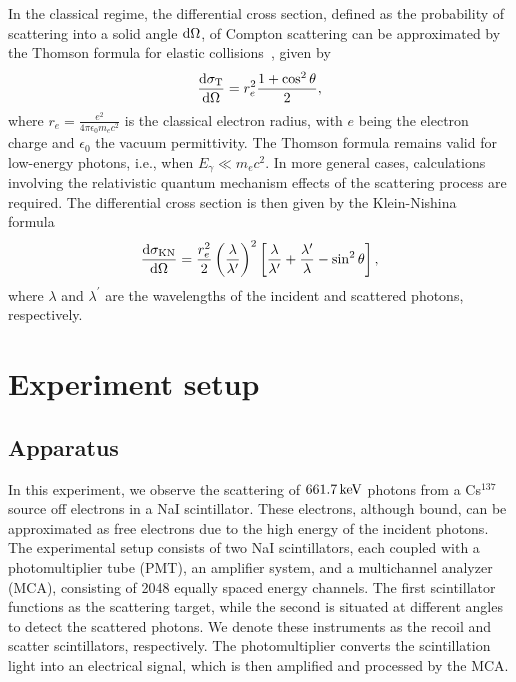\documentclass[aps,twocolumn,secnumarabic,balancelastpage,amsmath,amssymb,nofootinbib,floatfix]{revtex4-1}
\newcommand{\keV}{\,{\rm keV}}
\begin{document}
In the classical regime, the differential cross section, defined as the probability of scattering into a solid angle ${\rm{d}}\Omega$, of Compton scattering can be approximated by the Thomson formula for elastic collisions~\citep{Jackson1975}, given by
\begin{equation}
    \label{eq:thomson_cross_section}
    \frac{{\rm{d}}\sigma_{\rm{T}}}{{\rm{d}}\Omega} = r_e^2 \frac{1 + \cos^2{\theta}}{2},
\end{equation}
where $r_e = \frac{e^2}{4 \pi \epsilon_0 m_e c^2}$ is the classical electron radius, with $e$ being the electron charge and $\epsilon_0$ the vacuum permittivity. The Thomson formula remains valid for low-energy photons, i.e., when $E_\gamma \ll m_e c^2$. In more general cases, calculations involving the relativistic quantum mechanism effects of the scattering process are required. The differential cross section is then given by the Klein-Nishina formula~\citep{Weinberg1995}
\begin{equation}
    \label{eq:klein_nishina_cross_section}
    \frac{{\rm{d}}\sigma_{\rm{KN}}}{{\rm{d}}\Omega} = \frac{r_e^2}{2} \left(\frac{\lambda}{\lambda^\prime}\right)^2 \left[\frac{\lambda}{\lambda^\prime} + \frac{\lambda^\prime}{\lambda} - \sin^2{\theta}\right],
\end{equation}
where $\lambda$ and $\lambda^\prime$ are the wavelengths of the incident and scattered photons, respectively.


\section{Experiment setup}
\label{sec:experiment}

\subsection{Apparatus}
\label{ssec:apparatus}

In this experiment, we observe the scattering of $661.7\keV$ photons from a Cs$^{137}$ source off electrons in a NaI scintillator. These electrons, although bound, can be approximated as free electrons due to the high energy of the incident photons. The experimental setup consists of two NaI scintillators, each coupled with a photomultiplier tube (PMT), an amplifier system, and a multichannel analyzer (MCA), consisting of 2048 equally spaced energy channels. The first scintillator functions as the scattering target, while the second is situated at different angles to detect the scattered photons. We denote these instruments as the recoil and scatter scintillators, respectively. The photomultiplier converts the scintillation light into an electrical signal, which is then amplified and processed by the MCA.
\end{document}
